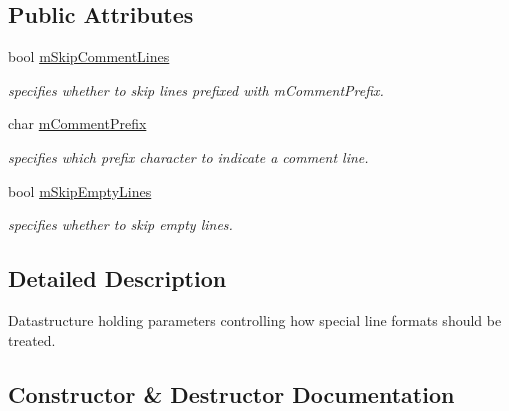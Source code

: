 \subsection*{Public Attributes}
\begin{DoxyCompactItemize}
\item 
\mbox{\label{structrapidcsv_1_1LineReaderParams_a1edac9abdc5a33fc06cc01ef46c90ef6}} 
bool \hyperlink{structrapidcsv_1_1LineReaderParams_a1edac9abdc5a33fc06cc01ef46c90ef6}{m\+Skip\+Comment\+Lines}
\begin{DoxyCompactList}\small\item\em specifies whether to skip lines prefixed with m\+Comment\+Prefix. \end{DoxyCompactList}\item 
\mbox{\label{structrapidcsv_1_1LineReaderParams_a63969673b0bf1517d537c7efb172b1c0}} 
char \hyperlink{structrapidcsv_1_1LineReaderParams_a63969673b0bf1517d537c7efb172b1c0}{m\+Comment\+Prefix}
\begin{DoxyCompactList}\small\item\em specifies which prefix character to indicate a comment line. \end{DoxyCompactList}\item 
\mbox{\label{structrapidcsv_1_1LineReaderParams_a85a5a9c3de206585bd0461a0b6126428}} 
bool \hyperlink{structrapidcsv_1_1LineReaderParams_a85a5a9c3de206585bd0461a0b6126428}{m\+Skip\+Empty\+Lines}
\begin{DoxyCompactList}\small\item\em specifies whether to skip empty lines. \end{DoxyCompactList}\end{DoxyCompactItemize}


\subsection{Detailed Description}
Datastructure holding parameters controlling how special line formats should be treated. 

\subsection{Constructor \& Destructor Documentation}
\mbox{\label{structrapidcsv_1_1LineReaderParams_ac503972c8771dca468a07b670c4e5be5}} 
